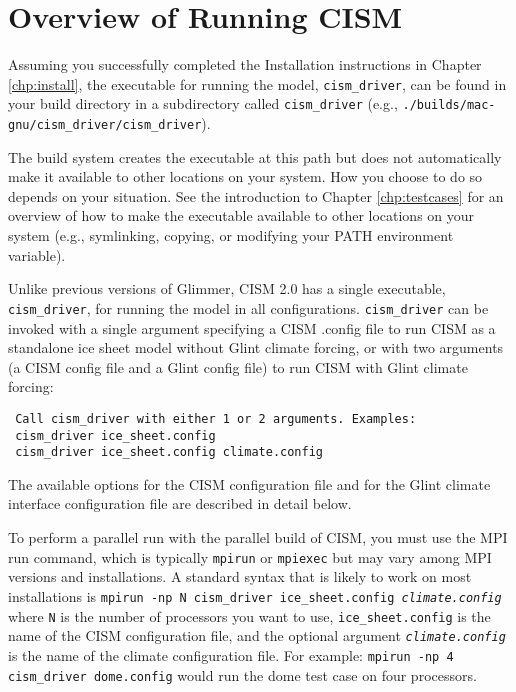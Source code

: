 \label{ch:runcism}

\section{Overview of Running CISM}

Assuming you successfully completed the Installation instructions in Chapter \ref{chp:install},
the executable for running the model, \texttt{cism\_driver}, can be found in your 
build directory in a subdirectory called \texttt{cism\_driver} 
(e.g., \texttt{./builds/mac-gnu/cism\_driver/cism\_driver}).

The build system creates the executable at this path but does not automatically
make it available to other locations on your system.  How you choose to do so depends 
on your situation.  See the introduction to Chapter \ref{chp:testcases} for 
an overview of how to make the executable available to other locations on your system
(e.g., symlinking, copying, or modifying your PATH environment variable).

Unlike previous versions of Glimmer, CISM 2.0 has a single executable, \texttt{cism\_driver},
for running the model in all configurations.
\texttt{cism\_driver} can be invoked with a single argument specifying 
a CISM .config file to run CISM as a standalone ice sheet model without Glint climate forcing,
or with two arguments (a CISM config file and a Glint config file) 
to run CISM with Glint climate forcing:
\begin{verbatim}
 Call cism_driver with either 1 or 2 arguments. Examples:
 cism_driver ice_sheet.config
 cism_driver ice_sheet.config climate.config
\end{verbatim}
The available options for the CISM configuration file and 
for the Glint climate interface configuration file are described in detail below.

To perform a parallel run with the parallel build of CISM, you must use the
MPI run command, which is typically \texttt{mpirun} or \texttt{mpiexec} but may 
vary among MPI versions and installations.  A standard syntax that is likely to
work on most installations is \newline
 \indent \texttt{mpirun -np N cism\_driver ice\_sheet.config \textit{climate.config}} \newline
where \texttt{N} is the number of processors you want to use, \texttt{ice\_sheet.config} is the name of the CISM
configuration file, and the optional argument \texttt{\textit{climate.config}} is the name 
of the climate configuration file.  For example: \newline
 \indent \texttt{mpirun -np 4 cism\_driver dome.config}\newline
would run the dome test case on four processors.

